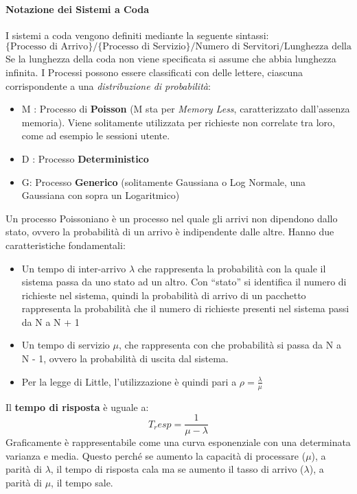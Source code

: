\documentclass{article}
\providecommand{\tightlist}{%
		  \setlength{\itemsep}{0pt}\setlength{\parskip}{0pt}}
\begin{document}
		\paragraph{Notazione dei Sistemi a Coda}\label{notazione-dei-sistemi-a-coda}
		I sistemi a coda vengono definiti mediante la seguente sintassi: \[
		\text{\{Processo di Arrivo\}/\{Processo di Servizio\}/Numero di Servitori/Lunghezza della Coda\}}
		\] Se la lunghezza della coda non viene specificata si assume che abbia
		lunghezza infinita. I Processi possono essere classificati con
		delle lettere, ciascuna corrispondente a una \emph{distribuzione di
			probabilità}:
		
		\begin{itemize}
			\tightlist
			\item
			M : Processo di \textbf{Poisson} (M sta per \emph{Memory
				Less}, caratterizzato dall'assenza memoria). Viene solitamente
			utilizzata per richieste non correlate tra loro, come
			ad esempio le sessioni utente.
			\item
			D : Processo \textbf{Deterministico}
			\item
			G: Processo \textbf{Generico} (solitamente Gaussiana o
			Log Normale, una Gaussiana con sopra un Logaritmico)
		\end{itemize}
		
		Un processo Poissoniano è un processo nel quale gli arrivi non dipendono dallo stato, ovvero la probabilità di un arrivo è indipendente dalle altre.
		Hanno due caratteristiche fondamentali:
		\begin{itemize}
			\item Un tempo di inter-arrivo $\lambda$ che rappresenta  la probabilità con la quale il sistema	passa da uno stato ad un altro. Con “stato” si identifica il numero di richieste nel sistema, quindi la probabilità di arrivo di un pacchetto rappresenta la probabilità che il numero di
			richieste presenti nel sistema passi da N a N + 1
			\item Un tempo di servizio $\mu$, che rappresenta con che probabilità si passa da N a N - 1, ovvero la probabilità di uscita dal sistema.
			\item Per la legge di Little, l'utilizzazione è quindi pari a $\rho = \frac{\lambda}{\mu}$ 
		\end{itemize}
		Il \textbf{tempo di risposta} è uguale a:
		\[T_resp = \frac{1}{\mu - \lambda}\]
		Graficamente è rappresentabile come una curva esponenziale con una determinata varianza e media.
		Questo perché se aumento la capacità di processare ($\mu$), a parità di $\lambda$, il tempo di risposta cala ma se aumento il tasso di arrivo ($\lambda$), a parità di $\mu$, il tempo sale.
		
\end{document}
